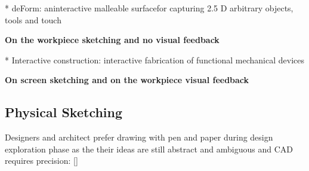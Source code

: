 * deForm: aninteractive malleable surfacefor capturing 2.5 D arbitrary objects, tools and touch

\textbf{On the workpiece sketching and no visual feedback} 

* Interactive construction: interactive fabrication of functional mechanical devices

\textbf{On screen sketching and on the workpiece visual feedback }






\subsection{Physical Sketching}
Designers and architect prefer drawing with pen and paper during design exploration phase as the their ideas are still abstract and ambiguous and CAD requires precision: [] %